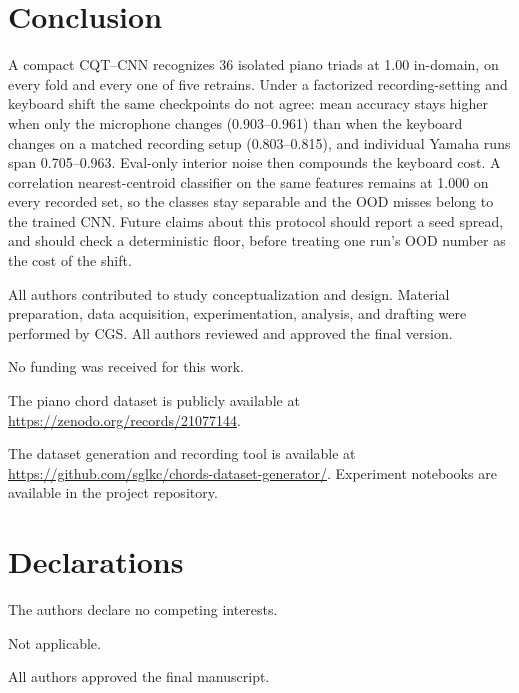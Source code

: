 \documentclass[pdflatex,sn-mathphys-num,iicol]{sn-jnl}
\theoremstyle{thmstyleone}
\theoremstyle{thmstyletwo}
\theoremstyle{thmstylethree}
\begin{document}
\section{Conclusion}\label{sec6}

A compact CQT--CNN recognizes 36 isolated piano triads at 1.00 in-domain, on every fold and every one of five retrains. Under a factorized recording-setting and keyboard shift the same checkpoints do not agree: mean accuracy stays higher when only the microphone changes (0.903--0.961) than when the keyboard changes on a matched recording setup (0.803--0.815), and individual Yamaha runs span 0.705--0.963. Eval-only interior noise then compounds the keyboard cost. A correlation nearest-centroid classifier on the same features remains at 1.000 on every recorded set, so the classes stay separable and the OOD misses belong to the trained CNN. Future claims about this protocol should report a seed spread, and should check a deterministic floor, before treating one run's OOD number as the cost of the shift.

\backmatter

All authors contributed to study conceptualization and design. Material preparation, data acquisition, experimentation, analysis, and drafting were performed by CGS. All authors reviewed and approved the final version.

No funding was received for this work.

The piano chord dataset is publicly available at \url{https://zenodo.org/records/21077144}.

The dataset generation and recording tool is available at \url{https://github.com/sglkc/chords-dataset-generator/}. Experiment notebooks are available in the project repository.

\section*{Declarations}

The authors declare no competing interests.

Not applicable.

All authors approved the final manuscript.


\end{document}
